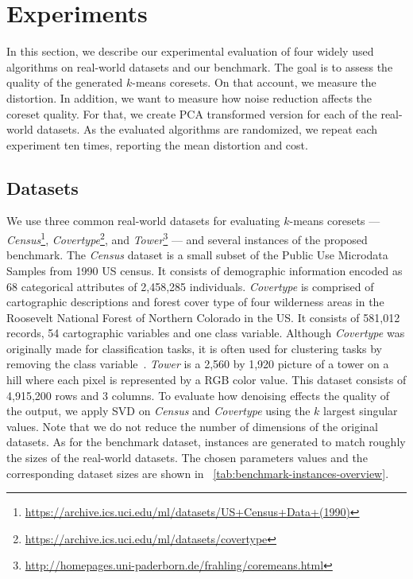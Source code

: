 \section{Experiments} \label{sec:experiments}
In this section, we describe our experimental evaluation of four widely used algorithms on real-world datasets and our benchmark. The goal is to assess the quality of the generated $k$-means coresets. On that account, we measure the distortion. In addition, we want to measure how noise reduction affects the coreset quality. For that, we create PCA transformed version for each of the real-world datasets. As the evaluated algorithms are randomized, we repeat each experiment ten times, reporting the mean distortion and cost.


\subsection{Datasets}
We use three common real-world datasets for evaluating $k$-means coresets 
---
\textit{Census}\footnote{\url{https://archive.ics.uci.edu/ml/datasets/US+Census+Data+(1990)}},
\textit{Covertype}\footnote{\url{https://archive.ics.uci.edu/ml/datasets/covertype}}, and 
\textit{Tower}\footnote{\url{http://homepages.uni-paderborn.de/frahling/coremeans.html}}
---
and several instances of the proposed benchmark. 
The \textit{Census} dataset is a small subset of the Public Use Microdata Samples from 1990 US census. It consists of demographic information encoded as 68 categorical attributes of 2,458,285 individuals. \textit{Covertype} is comprised of cartographic descriptions and forest cover type of four wilderness areas in the Roosevelt National Forest of Northern Colorado in the US. It consists of 581,012 records, 54 cartographic variables and one class variable. Although \textit{Covertype} was originally made for classification tasks, it is often used for clustering tasks by removing the class variable~\cite{AckermannMRSLS12}. \textit{Tower} is a 2,560 by 1,920 picture of a tower on a hill where each pixel is represented by a RGB color value. This dataset consists of 4,915,200 rows and 3 columns. To evaluate how denoising effects the quality of the output, we apply SVD on \textit{Census} and \textit{Covertype} using the $k$ largest singular values. Note that we do not reduce the number of dimensions of the original datasets. As for the benchmark dataset, instances are generated to match roughly the sizes of the real-world datasets. The chosen parameters values and the corresponding dataset sizes are shown in ~\cref{tab:benchmark-instances-overview}. 




